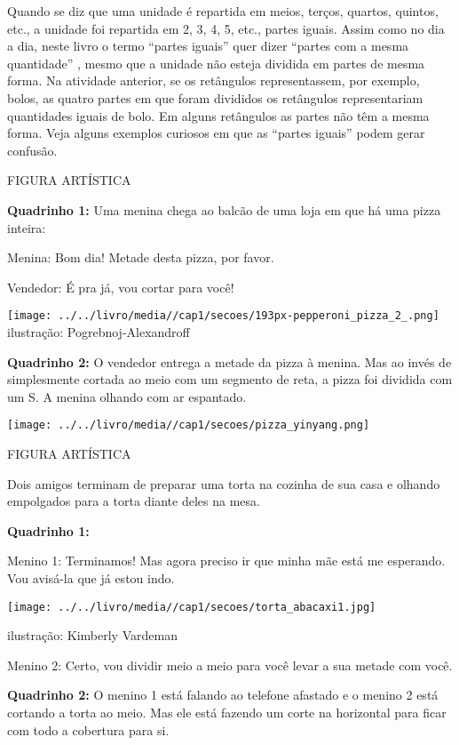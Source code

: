 \documentclass[a4,12pt]{book}
\begin{document}
\begin{refletindo*}[breakable]{}{}  
  Quando se diz que uma unidade é repartida em meios, terços, quartos, quintos, etc., a unidade foi repartida em 2, 3, 4, 5, etc., partes iguais.  
  Assim como no dia a dia, neste livro o termo   ``partes iguais''   quer dizer   ``partes com a mesma quantidade''  , mesmo que a unidade não esteja dividida em partes de mesma forma.  
  Na atividade anterior, se os retângulos representassem, por exemplo, bolos, as quatro partes em que foram divididos os retângulos representariam quantidades iguais de bolo.   
  Em alguns retângulos as partes não têm a mesma forma.  
  Veja alguns exemplos curiosos em que as   ``partes iguais''   podem gerar confusão.  
  
  \begin{imagem*}[breakable]{}{}     FIGURA ARTÍSTICA    
    
    {\bf Quadrinho 1:}     Uma menina chega ao balcão de uma loja em que há uma pizza inteira:     
    
    Menina: Bom dia! Metade desta pizza, por favor.     
    
    Vendedor: É pra já, vou cortar para você!    
    
        \texttt{[image: ../../livro/media//cap1/secoes/193px-pepperoni\_pizza\_2\_.png]}    
    ilustração: Pogrebnoj-Alexandroff    
    
    {\bf Quadrinho 2:}     O vendedor entrega a metade da pizza à menina. Mas ao invés de simplesmente cortada ao meio com um segmento de reta, a pizza foi dividida com um S. A menina olhando com ar espantado.     
    
        \texttt{[image: ../../livro/media//cap1/secoes/pizza\_yinyang.png]}    
  \end{imagem*}  
  
  \begin{imagem*}[breakable]{}{}     FIGURA ARTÍSTICA    
    
    Dois amigos terminam de preparar uma torta na cozinha de sua casa e olhando empolgados para a torta diante deles na mesa.    
    
    {\bf Quadrinho 1:}         
    
    Menino 1:  Terminamos! Mas agora preciso ir que minha mãe está me esperando. Vou avisá-la que já estou indo.    
    
        \texttt{[image: ../../livro/media//cap1/secoes/torta\_abacaxi1.jpg]}    
    
    ilustração: Kimberly Vardeman    
    
    Menino 2: Certo, vou dividir meio a meio para você levar a sua metade com você.    
    
    {\bf Quadrinho 2:}    
    O menino 1 está falando ao telefone afastado e o menino 2 está cortando a torta ao meio. Mas ele está fazendo um corte na horizontal para ficar com todo a cobertura para si.    
  \end{imagem*}  
\end{refletindo*}
\end{document}
